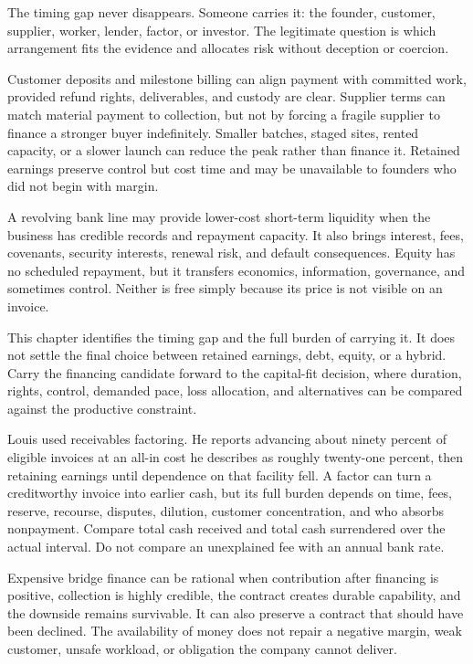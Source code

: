 The timing gap never disappears. Someone carries it: the founder, customer,
supplier, worker, lender, factor, or investor. The legitimate question is which
arrangement fits the evidence and allocates risk without deception or coercion.

Customer deposits and milestone billing can align payment with committed work,
provided refund rights, deliverables, and custody are clear. Supplier terms can
match material payment to collection, but not by forcing a fragile supplier to
finance a stronger buyer indefinitely. Smaller batches, staged sites, rented
capacity, or a slower launch can reduce the peak rather than finance it. Retained
earnings preserve control but cost time and may be unavailable to founders who
did not begin with margin.

A revolving bank line may provide lower-cost short-term liquidity when the
business has credible records and repayment capacity. It also brings interest,
fees, covenants, security interests, renewal risk, and default consequences.
Equity has no scheduled repayment, but it transfers economics, information,
governance, and sometimes control. Neither is free simply because its price is
not visible on an invoice.

This chapter identifies the timing gap and the full burden of carrying it. It
does not settle the final choice between retained earnings, debt, equity, or a
hybrid. Carry the financing candidate forward to the capital-fit decision,
where duration, rights, control, demanded pace, loss allocation, and alternatives
can be compared against the productive constraint.

Louis used receivables factoring. He reports advancing about ninety percent of
eligible invoices at an all-in cost he describes as roughly twenty-one percent,
then retaining earnings until dependence on that facility fell. A factor can
turn a creditworthy invoice into earlier cash, but its full burden depends on
time, fees, reserve, recourse, disputes, dilution, customer concentration, and
who absorbs nonpayment. Compare total cash received and total cash surrendered
over the actual interval. Do not compare an unexplained fee with an annual bank
rate.

Expensive bridge finance can be rational when contribution after financing is
positive, collection is highly credible, the contract creates durable
capability, and the downside remains survivable. It can also preserve a contract
that should have been declined. The availability of money does not repair a
negative margin, weak customer, unsafe workload, or obligation the company
cannot deliver.

